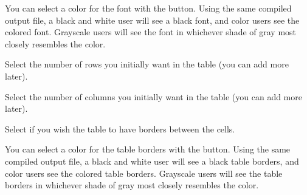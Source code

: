 
 You can select a color for the font
with the  button. Using the same compiled 
output file, a black and white user will see a black font, and
color users see the colored font. Grayscale users will see the 
font in whichever shade of gray most closely resembles the color. 


 Select the number of rows you initially want in
the table (you can add more later).

 Select the number of columns you initially
want in the table (you can add more later).

 Select if you wish the table to have borders
between the cells.

 You can select a color for the table borders
with the  button. Using the same compiled
output file, a black and white user will see a black table borders, and
color users see the colored table borders. Grayscale users will see the
table borders in whichever shade of gray most closely resembles the color.




